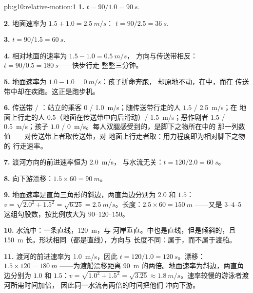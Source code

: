 \begin{solution}{pb:g10:relative-motion:1}
\textbf{1.} $t = 90/1.0 = \qty{90}{s}$.

\textbf{2.} 地面速率为 $1.5 + 1.0 = \qty{2.5}{m/s}$：
$t = 90/2.5 = \qty{36}{s}$.

\textbf{3.} $t = 90/1.5 = \qty{60}{s}$.

\textbf{4.} 相对地面的速率为 $1.5 - 1.0 = \qty{0.5}{m/s}$，
方向与传送带相反：$t = 90/0.5 = \qty{180}{s}$——快步行走
整整三分钟。

\textbf{5.} 地面速率为 $1.0 - 1.0 = \qty{0}{m/s}$：孩子拼命奔跑，
却原地不动，在中，而在
传送带中却在疾跑。这正是跑步机。

\textbf{6.} 传送带 / ：站立的乘客 $0$ /
\qty{1.0}{m/s}；随传送带行走的人 $1.5$ / \qty{2.5}{m/s}；在
地面上行走的人 $0.5$（地面在传送带中向后滑动）/
\qty{1.5}{m/s}；恶作剧者 $1.5$ / \qty{0.5}{m/s}；孩子 $1.0$ /
\qty{0}{m/s}。每人双腿感受到的，是脚下之物所在中的
那一列数值——对传送带上者取传送带，对
地面上行走者取：用力程度即为相对脚下之物的
行走速率。

\textbf{7.} 渡河方向的前进速率恒为 \qty{2.0}{m/s}，
与水流无关：$t = 120/2.0 = \qty{60}{s}$。

\textbf{8.} 向下游漂移：$1.5 \times 60 = \qty{90}{m}$。

\textbf{9.} 地面速率是直角三角形的斜边，两直角边分别为
$2.0$ 和 $1.5$：$v = \sqrt{2.0^2 + 1.5^2} = \sqrt{6.25}
= \qty{2.5}{m/s}$。长度：$2.5 \times 60 = \qty{150}{m}$
——又是 $3$--$4$--$5$ 这组勾股数，按比例放大为 $90$--$120$--$150$。

\textbf{10.} 水流中：一条直线，\qty{120}{m}，与
河岸垂直。中也是直线，但是倾斜的，且
\qty{150}{m} 长。形状相同（都是直线），方向与
长度不同：属于，而不属于渡船。

\textbf{11.} 渡河的前进速率为 \qty{1.0}{m/s}，因此
$t = 120/1.0 = \qty{120}{s}$。漂移：$1.5 \times 120 = \qty{180}{m}$
——为渡船漂移距离 \qty{90}{m} 的两倍。地面速率为斜边，两直角边分别为
$1.0$ 和 $1.5$：$v = \sqrt{1.0^2 + 1.5^2} = \sqrt{3.25}
\approx \qty{1.8}{m/s}$。速率较慢的游泳者渡河所需时间加倍，
因此同一水流有两倍的时间把他们
冲向下游。


\end{solution}
